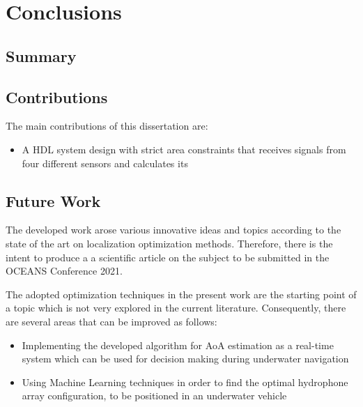 \chapter{Conclusions}  \label{chap:conclusion}

\section{Summary}

\section{Contributions }

The main contributions of this dissertation are: 
\begin{itemize}
	\item A HDL system design with strict area constraints that receives signals from four different sensors and calculates its 
\end{itemize}

\section{Future Work}

The developed work arose various innovative ideas and topics according to the state of the art on localization optimization methods. Therefore, there is the intent to produce a a scientific article on the subject to be submitted in the OCEANS Conference 2021.

The adopted optimization techniques in the present work are the starting point of a topic which is not very explored in the current literature. Consequently, there are several areas that can be improved as follows:

\begin{itemize}
	\item Implementing the developed algorithm for AoA estimation as a real-time system which can be used for decision making during underwater navigation
	\item Using Machine Learning techniques in order to find the optimal hydrophone array configuration, to be positioned in an underwater vehicle
\end{itemize}